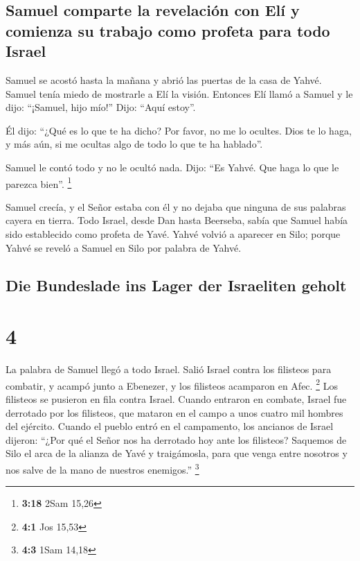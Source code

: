 \hypertarget{samuel-comparte-la-revelaciuxf3n-con-eluxed-y-comienza-su-trabajo-como-profeta-para-todo-israel}{%
\subsection{Samuel comparte la revelación con Elí y comienza su trabajo
como profeta para todo
Israel}\label{samuel-comparte-la-revelaciuxf3n-con-eluxed-y-comienza-su-trabajo-como-profeta-para-todo-israel}}

 Samuel se acostó hasta la mañana y abrió las puertas de
la casa de Yahvé. Samuel tenía miedo de mostrarle a Elí la visión.
 Entonces Elí llamó a Samuel y le dijo: ``¡Samuel, hijo
mío!'' Dijo: ``Aquí estoy''.

 Él dijo: ``¿Qué es lo que te ha dicho? Por favor, no me
lo ocultes. Dios te lo haga, y más aún, si me ocultas algo de todo lo
que te ha hablado''.

 Samuel le contó todo y no le ocultó nada. Dijo: ``Es
Yahvé. Que haga lo que le parezca bien''. \footnote{\textbf{3:18} 2Sam
  15,26}

 Samuel crecía, y el Señor estaba con él y no dejaba que
ninguna de sus palabras cayera en tierra.  Todo Israel,
desde Dan hasta Beerseba, sabía que Samuel había sido establecido como
profeta de Yavé.  Yahvé volvió a aparecer en Silo; porque
Yahvé se reveló a Samuel en Silo por palabra de Yahvé.

\hypertarget{die-bundeslade-ins-lager-der-israeliten-geholt}{%
\subsection{Die Bundeslade ins Lager der Israeliten
geholt}\label{die-bundeslade-ins-lager-der-israeliten-geholt}}

\hypertarget{section-3}{%
\section{4}\label{section-3}}

 La palabra de Samuel llegó a todo Israel. Salió Israel
contra los filisteos para combatir, y acampó junto a Ebenezer, y los
filisteos acamparon en Afec. \footnote{\textbf{4:1} Jos 15,53}
 Los filisteos se pusieron en fila contra Israel. Cuando
entraron en combate, Israel fue derrotado por los filisteos, que mataron
en el campo a unos cuatro mil hombres del ejército. 
Cuando el pueblo entró en el campamento, los ancianos de Israel dijeron:
``¿Por qué el Señor nos ha derrotado hoy ante los filisteos? Saquemos de
Silo el arca de la alianza de Yavé y traigámosla, para que venga entre
nosotros y nos salve de la mano de nuestros enemigos.'' \footnote{\textbf{4:3}
  1Sam 14,18}

